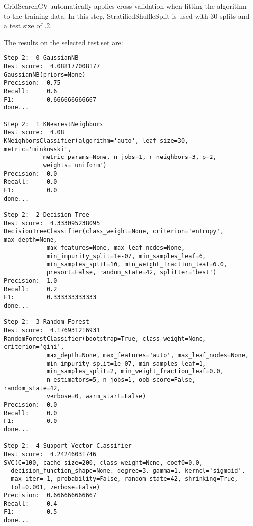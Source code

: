 \documentclass[11pt]{article} %
\begin{document}
{\selectfont GridSearchCV} automatically applies cross-validation when fitting the algorithm to the training data. In this step, {\selectfont StratifiedShuffleSplit} is used with 30 splits and a test size of .2.\medskip

The results on the selected test set are:
\begin{verbatim}
Step 2:  0 GaussianNB
Best score:  0.088177008177
GaussianNB(priors=None)
Precision:  0.75
Recall:     0.6
F1:         0.666666666667
done...
 
Step 2:  1 KNearestNeighbors
Best score:  0.08
KNeighborsClassifier(algorithm='auto', leaf_size=30, metric='minkowski',
           metric_params=None, n_jobs=1, n_neighbors=3, p=2,
           weights='uniform')
Precision:  0.0
Recall:     0.0
F1:         0.0
done...
 
Step 2:  2 Decision Tree
Best score:  0.333095238095
DecisionTreeClassifier(class_weight=None, criterion='entropy', max_depth=None,
            max_features=None, max_leaf_nodes=None,
            min_impurity_split=1e-07, min_samples_leaf=6,
            min_samples_split=10, min_weight_fraction_leaf=0.0,
            presort=False, random_state=42, splitter='best')
Precision:  1.0
Recall:     0.2
F1:         0.333333333333
done...
 
Step 2:  3 Random Forest
Best score:  0.176931216931
RandomForestClassifier(bootstrap=True, class_weight=None, criterion='gini',
            max_depth=None, max_features='auto', max_leaf_nodes=None,
            min_impurity_split=1e-07, min_samples_leaf=1,
            min_samples_split=2, min_weight_fraction_leaf=0.0,
            n_estimators=5, n_jobs=1, oob_score=False, random_state=42,
            verbose=0, warm_start=False)
Precision:  0.0
Recall:     0.0
F1:         0.0
done...
 
Step 2:  4 Support Vector Classifier
Best score:  0.24246031746
SVC(C=100, cache_size=200, class_weight=None, coef0=0.0,
  decision_function_shape=None, degree=3, gamma=1, kernel='sigmoid',
  max_iter=-1, probability=False, random_state=42, shrinking=True,
  tol=0.001, verbose=False)
Precision:  0.666666666667
Recall:     0.4
F1:         0.5
done...
\end{verbatim}
\end{document}
